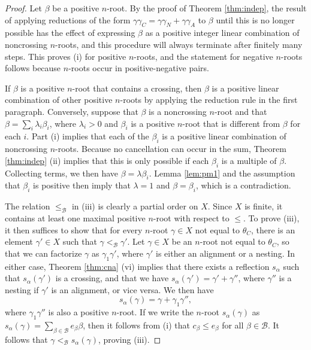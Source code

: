 \documentclass[10pt,a4paper]{amsart}
\newcommand{\Be}{\mathcal B}
\newcommand{\al}{\alpha}
\newcommand{\be}{\beta}
\begin{document}
\begin{proof}
Let $\be$ be a positive $n$-root. By the proof of Theorem \ref{thm:indep}, the
result of applying reductions of the form $\gamma \gamma_C = \gamma \gamma_N +
\gamma \gamma_A$ to $\be$ until this is no longer possible has the effect of
expressing $\be$ as a positive integer linear combination of noncrossing
$n$-roots, and this procedure will always terminate after finitely many steps.
This proves (i) for positive $n$-roots, and the statement for negative $n$-roots
follows because $n$-roots occur in positive-negative pairs.

If $\be$ is a positive $n$-root that contains a crossing, then $\be$ is a
positive linear combination of other positive $n$-roots by applying the
reduction rule in the first paragraph. Conversely, suppose that $\be$ is a
noncrossing $n$-root and that $\be = \sum_i \lambda_i \be_i$, where $\lambda_i >
0$ and $\be_i$ is a positive $n$-root that is different from $\be$  for each
$i$. Part (i) implies that each of the $\be_i$ is a positive linear combination
of noncrossing $n$-roots. Because no cancellation can occur in the sum, Theorem
\ref{thm:indep} (ii) implies that this is only possible if each $\be_i$ is a
multiple of $\be$.  Collecting terms, we then have $\be = \lambda \be_i$. Lemma
\ref{lem:pm1} and the assumption that $\be_i$ is positive then imply that
$\lambda=1$ and $\be = \be_i$, which is a contradiction.

The relation $\le_\Be$ in (iii) is clearly a partial order on $X$.  Since $X$ is
finite, it contains at least one maximal positive $n$-root with respect to
$\le$. To prove (iii), it then suffices to show that for every  $n$-root
$\gamma\in X$ not equal to $\theta_C$, there is an element $\gamma'\in X$ such
that $\gamma<_\Be\gamma'$.  Let $\gamma\in X$ be an $n$-root not equal to
$\theta_C$, so that we can factorize $\gamma$ as $\gamma_1 \gamma'$, where
$\gamma'$ is either an alignment or a nesting. In either case, Theorem
\ref{thm:cna} (vi) implies that there exists a reflection $s_\al$ such that
$s_\al(\gamma')$ is a crossing, and that we have $s_\al(\gamma') = \gamma' +
\gamma''$, where $\gamma''$ is a nesting if $\gamma'$ is an alignment, or vice
versa. We then have $$ s_\al(\gamma) = \gamma + \gamma_1\gamma'' ,$$ where
$\gamma_1\gamma''$ is also a positive $n$-root. If we write  the $n$-root
$s_\al(\gamma)$ as $s_\al(\gamma) = \sum_{\be \in \Be} e_\be \be$, then it
follows from (i) that $c_\be \leq e_\be$ for all $\be \in \Be$. It follows that
$\gamma<_\Be s_\al(\gamma)$, proving (iii).


\end{proof}
\end{document}
